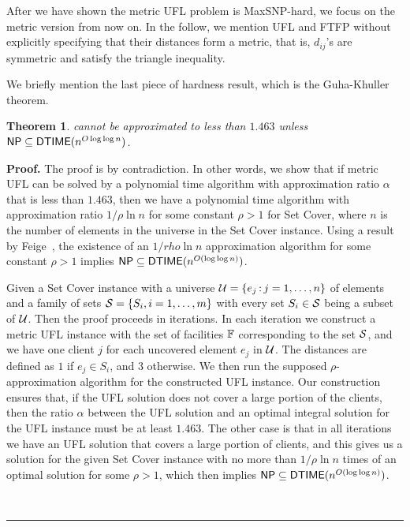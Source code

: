 \documentclass[oneside,final]{ucr}
\newtheorem{theorem}{Theorem}
\newenvironment{proof}[1][Proof]{\textbf{#1.} }{\ \rule{0.5em}{0.5em}}
\begin{document}
After we have shown the metric UFL problem is MaxSNP-hard, we focus on
the metric version from now on. In the follow, we mention UFL and FTFP
without explicitly specifying that their distances form a metric, that
is, $d_{ij}$'s are symmetric and satisfy the triangle inequality.

We briefly mention the last piece of hardness result, which is the
Guha-Khuller theorem.
\begin{theorem}\label{thm:1463}
  {\UFL} cannot be approximated to less than $1.463$ unless ${\mbox{\sf NP}}
  \subseteq {\mbox{\sf DTIME}}(n^{O\log\log n})$.
\end{theorem}

\begin{proof}
  The proof is by contradiction. In other words, we show that if
  metric UFL can be solved by a polynomial time algorithm with
  approximation ratio $\alpha$ that is less than $1.463$, then we have
  a polynomial time algorithm with approximation ratio $1/\rho \ln n$
  for some constant $\rho > 1$ for Set Cover, where $n$ is the number
  of elements in the universe in the Set Cover instance. Using a
  result by Feige~\cite{Feige98}, the existence of an $1/rho \ln n$
  approximation algorithm for some constant $\rho > 1$ implies ${\mbox{\sf NP}}
  \subseteq {\mbox{\sf DTIME}}(n^{O(\log\log n)})$.

  Given a Set Cover instance with a universe $\calU = \{e_j \suchthat
  j=1,\ldots, n\}$ of elements and a family of sets $\calS = \{S_i,
  i=1,\ldots,m\}$ with every set $S_i \in \calS$ being a subset of
  $\calU$. Then the proof proceeds in iterations. In each iteration we
  construct a metric UFL instance with the set of facilities
  $\mathbb{F}$ corresponding to the set $\calS$, and we have one client
  $j$ for each uncovered element $e_j$ in $\calU$. The distances are
  defined as $1$ if $e_j \in S_i$, and $3$ otherwise. We then run the
  supposed $\rho$-approximation algorithm for the constructed UFL
  instance. Our construction ensures that, if the UFL solution does
  not cover a large portion of the clients, then the ratio $\alpha$
  between the UFL solution and an optimal integral solution for the
  UFL instance must be at least $1.463$. The other case is that in all
  iterations we have an UFL solution that covers a large portion of
  clients, and this gives us a solution for the given Set Cover
  instance with no more than $1/\rho \ln n$ times of an optimal
  solution for some $\rho > 1$, which then implies ${\mbox{\sf NP}} \subseteq
  {\mbox{\sf DTIME}}(n^{O(\log\log n)})$.


\end{proof}
\end{document}
